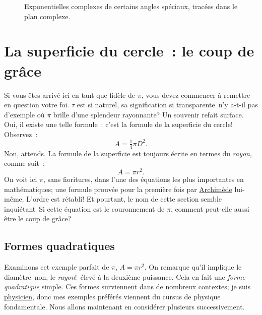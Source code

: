 \begin{figure}
\begin{center}
\end{center}
\caption{Exponentielles complexes de certains angles spéciaux, tracées dans le
plan complexe.\label{fig:tau_euler_circle}}
\end{figure}


\section{La superficie du cercle~: le coup de grâce} %
\label{sec:circular_area}

Si vous êtes arrivé ici en tant que fidèle de $\pi$, vous devez commencer à
remettre en question votre foi. $\tau$ est si naturel, sa signification
si transparente\textellipsis\ n'y a-t-il pas d'exemple où $\pi$ brille d'une
splendeur rayonnante\ns? Un souvenir refait surface. Oui, il existe une telle
formule~: c'est la formule de la superficie du cercle\ns! Observez~:
\[ A = \tfrac{1}{4} \pi D^2. \]
Non, attends. La formule de la superficie est toujours écrite en termes du
\emph{rayon}, comme suit~:
\[ A = \pi r^2. \]
On voit ici $\pi$, sans fioritures, dans l'une des équations les plus
importantes en mathématiques\ns; une formule prouvée pour la première fois par
\href{https://fr.wikipedia.org/wiki/Archimède}{Archimède} lui-même. L'ordre est
rétabli\ns! Et pourtant, le nom de cette section semble inquiétant\textellipsis\
Si cette équation est le couronnement de $\pi$, comment peut-elle aussi être le
coup de grâce\ns?


  \subsection{Formes quadratiques} %
  \label{sec:quadratic_forms}

Examinons cet exemple parfait de $\pi$, $A = \pi r^2$. On remarque qu'il implique
le diamètre\textellipsis\ non, le \emph{rayon}\ns !\ élevé à la deuxième puissance.
Cela en fait une \emph{forme quadratique} simple. Ces formes surviennent
dans de nombreux contextes\ns; je suis
\href{https://translate.google.com/translate?hl=en&sl=en&tl=fr&u=https://thesis.library.caltech.edu/1940/}{physicien},
donc mes exemples
préférés viennent du cursus de physique fondamentale. Nous allons maintenant en
considérer plusieurs successivement.

